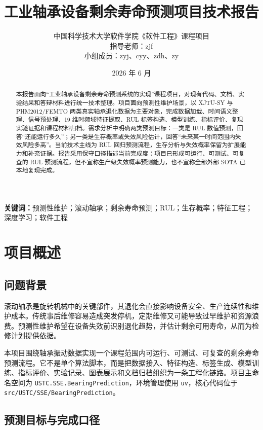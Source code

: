 \documentclass[UTF8,a4paper,12pt]{ctexart}
\title{\textbf{工业轴承设备剩余寿命预测项目技术报告}}
\author{中国科学技术大学软件学院《软件工程》课程项目\\指导老师：zjf\\小组成员：zyj、cyy、zdh、zy}
\date{2026 年 6 月}
\newcommand{\code}[1]{\texttt{#1}}
\begin{document}
\maketitle

\begin{abstract}
本报告面向“工业轴承设备剩余寿命预测系统的实现”课程项目，对现有代码、文档、实验结果和答辩材料进行统一技术整理。项目面向预测性维护场景，以 XJTU-SY 与 PHM2012/FEMTO 两类真实轴承退化数据为主要对象，完成数据加载、时间语义整理、信号预处理、19 维时频域特征提取、RUL 标签构造、模型训练、指标评价、复现实验证据和课程材料归档。需求分析中明确两类预测目标：一类是 RUL 数值预测，回答“还能运行多久”；另一类是生存概率或失效风险估计，回答“未来某一时间范围内失效风险多高”。当前技术主线为 RUL 回归预测流程，生存分析与失效概率保留为扩展能力和补充证据。报告采用保守口径描述当前完成度：项目已形成可运行、可测试、可复查的 RUL 预测流程，但不宣称生产级失效概率预测能力，也不宣称全部外部 SOTA 已本地复现完成。
\end{abstract}

\noindent\textbf{关键词：}预测性维护；滚动轴承；剩余寿命预测；RUL；生存概率；特征工程；深度学习；软件工程

\newpage
\tableofcontents
\newpage

\section{项目概述}

\subsection{问题背景}

滚动轴承是旋转机械中的关键部件，其退化会直接影响设备安全、生产连续性和维护成本。传统事后维修容易造成突发停机，定期维修又可能导致过早维护和资源浪费。预测性维护希望在设备失效前识别退化趋势，并估计剩余可用寿命，从而为检修计划提供依据。

本项目围绕轴承振动数据实现一个课程范围内可运行、可测试、可复查的剩余寿命预测流程。它不是单个算法脚本，而是把数据接入、特征构造、标签生成、模型训练、指标评价、实验记录、图表展示和文档归档组织为一条工程化链路。项目主命名空间为 \code{USTC.SSE.BearingPrediction}，环境管理使用 \code{uv}，核心代码位于 \code{src/USTC/SSE/BearingPrediction}。

\subsection{预测目标与完成口径}
\end{document}
